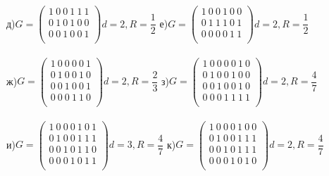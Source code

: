 \documentclass[fontsize=12pt]{article}
\begin{document}
\noindent
д)$G = \begin{pmatrix}
1\ 0\ 0\ 1\ 1\ 1\\
0\ 1\ 0\ 1\ 0\ 0\\
0\ 0\ 1\ 0\ 0\ 1\\
\end{pmatrix} d = 2, R = \dfrac{1}{2}$
{ } { } { }  { } { } { }
е)$G = \begin{pmatrix}
1\ 0\ 0\ 1\ 0\ 0\\
0\ 1\ 1\ 1\ 0\ 1\\
0\ 0\ 0\ 0\ 1\ 1\\
\end{pmatrix} d = 2, R = \dfrac{1}{2}$\\\\

\noindent
ж)$G = \begin{pmatrix}
1\ 0\ 0\ 0\ 0\ 1\\
0\ 1\ 0\ 0\ 1\ 0\\
0\ 0\ 1\ 0\ 0\ 1\\
0\ 0\ 0\ 1\ 1\ 0\\
\end{pmatrix} d = 2, R = \dfrac{2}{3}$
{ } { } { }  { } { } { }
з)$G = \begin{pmatrix}
1\ 0\ 0\ 0\ 0\ 1\ 0\\
0\ 1\ 0\ 0\ 1\ 0\ 0\\
0\ 0\ 1\ 0\ 0\ 1\ 0\\
0\ 0\ 0\ 1\ 1\ 1\ 1\\
\end{pmatrix} d = 2, R = \dfrac{4}{7}$\\\\

\noindent
и)$G = \begin{pmatrix}
1\ 0\ 0\ 0\ 1\ 0\ 1\\
0\ 1\ 0\ 0\ 1\ 1\ 1\\
0\ 0\ 1\ 0\ 1\ 1\ 0\\
0\ 0\ 0\ 1\ 0\ 1\ 1\\
\end{pmatrix} d = 3, R = \dfrac{4}{7}$
{ } { } { }  { } { } { }
к)$G = \begin{pmatrix}
1\ 0\ 0\ 0\ 1\ 0\ 0\\
0\ 1\ 0\ 0\ 1\ 1\ 1\\
0\ 0\ 1\ 0\ 1\ 1\ 1\\
0\ 0\ 0\ 1\ 0\ 1\ 0\\
\end{pmatrix} d = 2, R = \dfrac{4}{7}$\\\\
\end{document}
